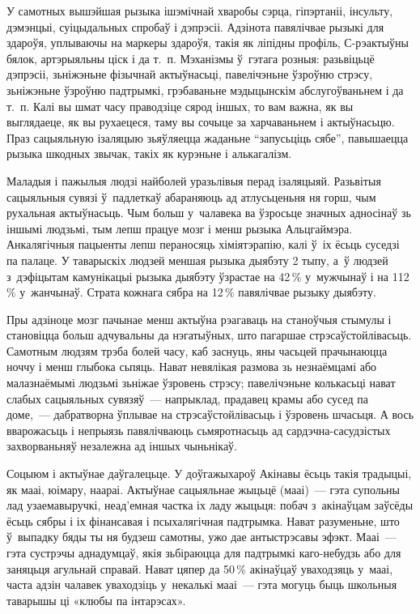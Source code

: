 У самотных вышэйшая рызыка ішэмічнай хваробы сэрца, гіпэртаніі, інсульту, дэмэнцыі, суіцыдальных спробаў і дэпрэсіі. Адзінота павялічвае рызыкі для здароўя, уплываючы на маркеры здароўя, такія як ліпідны профіль, С-рэактыўны бялок, артэрыяльны ціск і да т.~п. Мэханізмы ў~гэтага розныя: разьвіцьцё дэпрэсіі, зьніжэньне фізычнай актыўнасьці, павелічэньне ўзроўню стрэсу, зьніжэньне ўзроўню падтрымкі, грэбаваньне мэдыцынскім абслугоўваньнем і да т.~п. Калі вы шмат часу праводзіце сярод іншых, то вам важна, як вы выглядаеце, як вы рухаецеся, таму вы сочыце за харчаваньнем і актыўнасьцю. Праз сацыяльную ізаляцыю зьяўляецца жаданьне ``запусьціць сябе'', павышаецца рызыка шкодных звычак, такіх як курэньне і алькагалізм.

Маладыя і пажылыя людзі найболей уразьлівыя перад ізаляцыяй. Разьвітыя сацыяльныя сувязі ў~падлеткаў абараняюць ад атлусьценьня ня горш, чым рухальная актыўнасьць. Чым больш у~чалавека ва ўзросьце значных адносінаў зь іншымі людзьмі, тым лепш працуе мозг і менш рызыка Альцгаймэра. Анкалягічныя пацыенты лепш пераносяць хіміятэрапію, калі ў~іх ёсьць суседзі па палаце. У таварыскіх людзей меншая рызыка дыябэту 2 тыпу, а~ў людзей з~дэфіцытам камунікацыі рызыка дыябэту ўзрастае на 42\,\% у~мужчынаў і на 112\,\% у~жанчынаў. Страта кожнага сябра на 12\,\% павялічвае рызыку дыябэту.

Пры адзіноце мозг пачынае менш актыўна рэагаваць на станоўчыя стымулы і становіцца больш адчувальны да нэгатыўных, што пагаршае стрэсаўстойлівасьць. Самотным людзям трэба болей часу, каб заснуць, яны часьцей прачынаюцца ноччу і менш глыбока сьпяць. Нават невялікая размова зь незнаёмцамі або малазнаёмымі людзьмі зьніжае ўзровень стрэсу; павелічэньне колькасьці нават слабых сацыяльных сувязяў~--- напрыклад, прадавец крамы або сусед па доме,~--- дабратворна ўплывае на стрэсаўстойлівасьць і ўзровень шчасьця. А вось вварожасьць і непрыязь павялічваюць сьмяротнасьць ад сардэчна-сасудзістых захворваньняў незалежна ад іншых чыньнікаў. 

Соцыюм і актыўнае даўгалецьце. У доўгажыхароў Акінавы ёсьць такія традыцыі, як мааі, юімару, наараі. Актыўнае сацыяльнае жыцьцё (мааі)~--- гэта супольны лад узаемавыручкі, неад'емная частка іх ладу жыцьця: побач з~акінаўцам заўсёды ёсьць сябры і іх фінансавая і псыхалягічная падтрымка. Нават разуменьне, што ў~выпадку бяды ты ня будзеш самотны, ужо дае антыстрэсавы эфэкт. Мааі~--- гэта сустрэчы аднадумцаў, якія зьбіраюцца для падтрымкі каго-небудзь або для заняцьця агульнай справай. Нават цяпер да 50\,\% акінаўцаў уваходзяць у~мааі, часта адзін чалавек уваходзіць у~некалькі мааі~--- гэта могуць быць школьныя таварышы ці «клюбы па інтарэсах».

